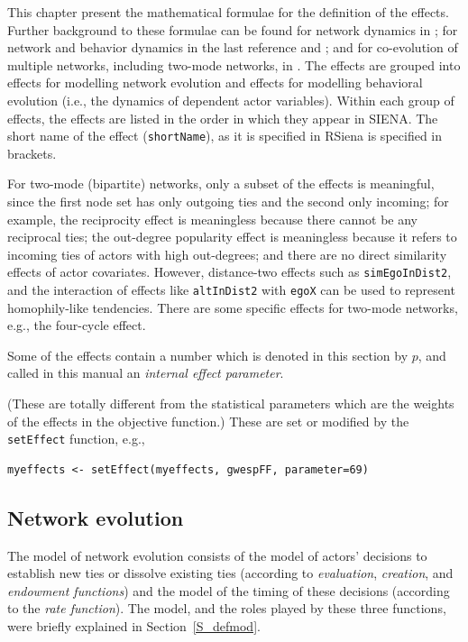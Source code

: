\documentclass[a4paper,fleqn,11pt]{article}
\newcommand{\+}{\, + \,}
\newcommand{\RS}{{\sf RSiena }}
\newcommand{\si}{{\sf SIENA}}
\begin{document}
This chapter present the mathematical formulae for the definition of the
effects. Further background to these formulae can be found
for network dynamics in \citet{Snijders01,Snijders05,SnijdersEA10b};
for network and behavior dynamics in the last reference and
\citet*{SteglichEA10}; and for co-evolution of multiple networks,
including two-mode networks, in \citet{SLT2013}.
The effects are grouped into effects for modelling network
evolution and effects for modelling behavioral evolution (i.e.,
the dynamics of dependent actor variables). Within each group of
effects, the effects are listed in the order in which they appear
in \si. The short name of the effect (\texttt{shortName}),
as it is specified in \RS is specified in brackets.


For two-mode (bipartite) networks, only a subset of the effects is
meaningful, since the first node set has only outgoing ties
and the second only incoming; for example, the reciprocity effect
is meaningless because there cannot be any reciprocal ties;
the out-degree popularity effect is meaningless because it refers to
incoming ties of actors with high out-degrees; and there are no direct
similarity effects of actor covariates. However, distance-two effects
such as \texttt{simEgoInDist2}, and the interaction of effects like
\texttt{altInDist2} with \texttt{egoX} can be used to represent
homophily-like tendencies.
There are some specific effects for two-mode networks, e.g.,
the four-cycle effect.

\hypertarget{T_effpar}{
Some of the effects contain a number which is denoted in this section
by $p$, and called in this manual an \emph{internal effect parameter}.
}
(These are totally different from the statistical parameters which are
the weights of the effects in the objective function.)
These are set or modified by the \texttt{setEffect} function, e.g.,
\begin{verbatim}
myeffects <- setEffect(myeffects, gwespFF, parameter=69)
\end{verbatim}

\subsection{Network evolution}
The model of network evolution consists of the model of actors'
decisions to establish new ties or dissolve existing ties
(according to {\it evaluation}, {\it creation},
and {\it endowment functions}) and the
model of the timing of these decisions (according to the {\it rate
function}).
The model, and the roles played by these three functions,
were briefly explained in Section~\ref{S_defmod}.
\end{document}
